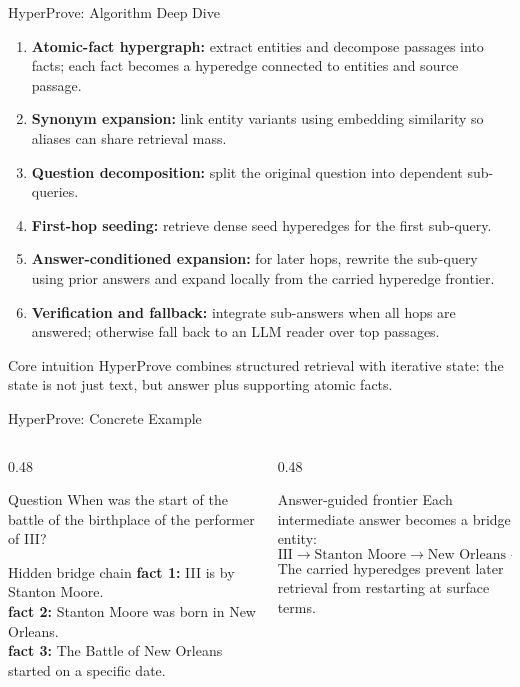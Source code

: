 
\begin{frame}{HyperProve: Algorithm Deep Dive}
\scriptsize
\begin{enumerate}
  \item \textbf{Atomic-fact hypergraph:} extract entities and decompose passages into facts; each fact becomes a hyperedge connected to entities and source passage.
  \item \textbf{Synonym expansion:} link entity variants using embedding similarity so aliases can share retrieval mass.
  \item \textbf{Question decomposition:} split the original question into dependent sub-queries.
  \item \textbf{First-hop seeding:} retrieve dense seed hyperedges for the first sub-query.
  \item \textbf{Answer-conditioned expansion:} for later hops, rewrite the sub-query using prior answers and expand locally from the carried hyperedge frontier.
  \item \textbf{Verification and fallback:} integrate sub-answers when all hops are answered; otherwise fall back to an LLM reader over top passages.
\end{enumerate}
\begin{block}{Core intuition}
HyperProve combines structured retrieval with iterative state: the state is not just text, but answer plus supporting atomic facts.
\end{block}
\end{frame}

\begin{frame}{HyperProve: Concrete Example}
\scriptsize
\begin{columns}[T,onlytextwidth]
  \begin{column}{0.48\textwidth}
    \begin{block}{Question}
      When was the start of the battle of the birthplace of the performer of III?
    \end{block}
    \begin{block}{Hidden bridge chain}
      \textbf{fact 1:} III is by Stanton Moore.\\
      \textbf{fact 2:} Stanton Moore was born in New Orleans.\\
      \textbf{fact 3:} The Battle of New Orleans started on a specific date.
    \end{block}
  \end{column}
  \begin{column}{0.48\textwidth}
    \begin{block}{Answer-guided frontier}
      Each intermediate answer becomes a bridge entity:
      \[
      \text{III} \rightarrow \text{Stanton Moore} \rightarrow \text{New Orleans} \rightarrow \text{battle date}
      \]
      The carried hyperedges prevent later retrieval from restarting at surface terms.
    \end{block}
  \end{column}
\end{columns}
\end{frame}


